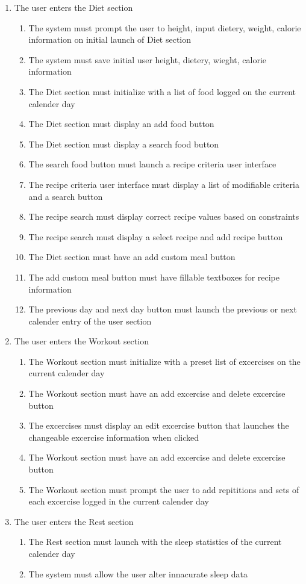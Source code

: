 \documentclass[12pt,letterpaper]{article}
\begin{document}
\begin{enumerate}[{BE}1.]
\item The user enters the Diet section
\begin{enumerate}[resume*]
\item  The system must prompt the user to height, input dietery, weight,  calorie information on initial launch of Diet section
\item  The system must save initial user height, dietery, wieght, calorie information
\item  The Diet section must initialize with a list of food logged on the current calender day
\item  The Diet section must display an add food button
\item  The Diet section must display a search food button
\item  The search food button must launch a recipe criteria user interface
\item  The recipe criteria user interface must display a list of modifiable criteria and a search button
\item  The recipe search must display correct recipe values based on constraints
\item  The recipe search must display a select recipe and add recipe button
\item  The Diet section must have an add custom meal button
\item  The add custom meal button must have fillable textboxes for recipe information
\item  The previous day and next day button must launch the previous or next calender entry of the user section
\end{enumerate}

\item The user enters the Workout section
\begin{enumerate}[resume*]
\item  The Workout section must initialize with a preset list of excercises on the current calender day
\item  The Workout section must have an add excercise and delete excercise button
\item  The excercises must display an edit excercise button that launches the changeable excercise information when clicked
\item  The Workout section must have an add excercise and delete excercise button
\item  The Workout section must prompt the user to add repititions and sets of each excercise logged in the current calender day
\end{enumerate}

\item The user enters the Rest section
\begin{enumerate}[resume*]
\item  The Rest section must launch with the sleep statistics of the current calender day
\item  The system must allow the user alter innacurate sleep data
\end{enumerate}
\end{enumerate}
\end{document}
